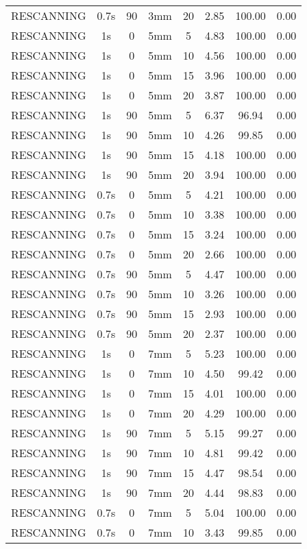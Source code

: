 \begin{table}[H]
\begin{tabular}{|c||c|c|c|c||c|c|c|}
RESCANNING & 0.7s & 90 & 3mm & 20 & 2.85 & 100.00 & 0.00 \\
RESCANNING & 1s & 0 & 5mm & 5 & 4.83 & 100.00 & 0.00 \\
RESCANNING & 1s & 0 & 5mm & 10 & 4.56 & 100.00 & 0.00 \\
RESCANNING & 1s & 0 & 5mm & 15 & 3.96 & 100.00 & 0.00 \\
RESCANNING & 1s & 0 & 5mm & 20 & 3.87 & 100.00 & 0.00 \\
RESCANNING & 1s & 90 & 5mm & 5 & 6.37 & 96.94 & 0.00 \\
RESCANNING & 1s & 90 & 5mm & 10 & 4.26 & 99.85 & 0.00 \\
RESCANNING & 1s & 90 & 5mm & 15 & 4.18 & 100.00 & 0.00 \\
RESCANNING & 1s & 90 & 5mm & 20 & 3.94 & 100.00 & 0.00 \\
RESCANNING & 0.7s & 0 & 5mm & 5 & 4.21 & 100.00 & 0.00 \\
RESCANNING & 0.7s & 0 & 5mm & 10 & 3.38 & 100.00 & 0.00 \\
RESCANNING & 0.7s & 0 & 5mm & 15 & 3.24 & 100.00 & 0.00 \\
RESCANNING & 0.7s & 0 & 5mm & 20 & 2.66 & 100.00 & 0.00 \\
RESCANNING & 0.7s & 90 & 5mm & 5 & 4.47 & 100.00 & 0.00 \\
RESCANNING & 0.7s & 90 & 5mm & 10 & 3.26 & 100.00 & 0.00 \\
RESCANNING & 0.7s & 90 & 5mm & 15 & 2.93 & 100.00 & 0.00 \\
RESCANNING & 0.7s & 90 & 5mm & 20 & 2.37 & 100.00 & 0.00 \\
RESCANNING & 1s & 0 & 7mm & 5 & 5.23 & 100.00 & 0.00 \\
RESCANNING & 1s & 0 & 7mm & 10 & 4.50 & 99.42 & 0.00 \\
RESCANNING & 1s & 0 & 7mm & 15 & 4.01 & 100.00 & 0.00 \\
RESCANNING & 1s & 0 & 7mm & 20 & 4.29 & 100.00 & 0.00 \\
RESCANNING & 1s & 90 & 7mm & 5 & 5.15 & 99.27 & 0.00 \\
RESCANNING & 1s & 90 & 7mm & 10 & 4.81 & 99.42 & 0.00 \\
RESCANNING & 1s & 90 & 7mm & 15 & 4.47 & 98.54 & 0.00 \\
RESCANNING & 1s & 90 & 7mm & 20 & 4.44 & 98.83 & 0.00 \\
RESCANNING & 0.7s & 0 & 7mm & 5 & 5.04 & 100.00 & 0.00 \\
RESCANNING & 0.7s & 0 & 7mm & 10 & 3.43 & 99.85 & 0.00 \\

\end{tabular}
\end{table}
